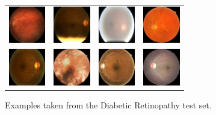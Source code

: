 \documentclass[journal]{IEEEtran}
\begin{document}
		\begin{figure}[!t]
			\centering
			\begin{tabular}{cccc}
			\includegraphics[width=1.6cm]{img/retinopathy/1.jpg} & \includegraphics[width=1.6cm]{img/retinopathy/2.jpg} & \includegraphics[width=1.6cm]{img/retinopathy/3.jpg} & \includegraphics[width=1.6cm]{img/retinopathy/4.jpg}\\
			\includegraphics[width=1.6cm]{img/retinopathy/5.jpg} & \includegraphics[width=1.6cm]{img/retinopathy/6.jpg} & \includegraphics[width=1.6cm]{img/retinopathy/7.jpg} & \includegraphics[width=1.6cm]{img/retinopathy/8.jpg}
			\end{tabular}						
			\caption{Examples taken from the Diabetic Retinopathy test set.}
			\label{fig:DRexamples}
		\end{figure}
		
\end{document}
